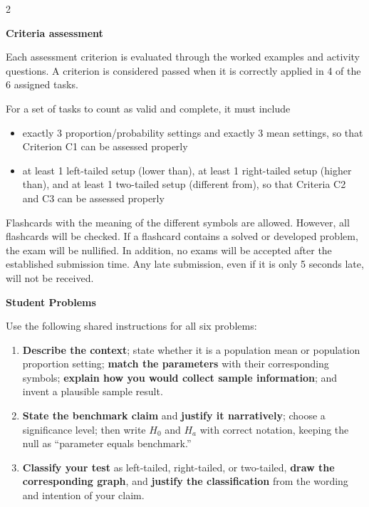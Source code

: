 \documentclass[12pt]{article}
\newcommand{\SubsectionBox}[1]{%
\noindent\colorbox{gray!30}{%
\parbox{\linewidth}{\textbf{#1}}%
}\par\vspace{0.35cm}%
}
\begin{document}
\begin{multicols}{2}
\SubsectionBox{Criteria assessment}\vspace{-0.25cm}
Each assessment criterion is evaluated through the worked examples and activity questions. A criterion is considered passed when it is correctly applied in 4 of the 6 assigned tasks.

For a set of tasks to count as valid and complete, it must include
\begin{itemize}
	\item exactly 3 proportion/probability settings and exactly 3 mean settings, so that Criterion C1 can be assessed properly
	\item at least 1 left-tailed setup (lower than), at least 1 right-tailed setup (higher than), and at least 1 two-tailed setup (different from), so that Criteria C2 and C3 can be assessed properly
\end{itemize}

Flashcards with the meaning of the different symbols are allowed. However, all flashcards will be checked. If a flashcard contains a solved or developed problem, the exam will be nullified. In addition, no exams will be accepted after the established submission time. Any late submission, even if it is only 5 seconds late, will not be received.

\vspace{0.25cm}
\SubsectionBox{Student Problems}\vspace{-0.25cm}

Use the following shared instructions for all six problems:
\begin{enumerate}
\item[(C1)] \textbf{Describe the context}; state whether it is a population mean or population proportion setting; \textbf{match the parameters} with their corresponding symbols; \textbf{explain how you would collect sample information}; and invent a plausible sample result.
\item[(C2)] \textbf{State the benchmark claim} and \textbf{justify it narratively}; choose a significance level; then write \(H_0\) and \(H_a\) with correct notation, keeping the null as ``parameter equals benchmark.''
\item[(C3)] \textbf{Classify your test} as left-tailed, right-tailed, or two-tailed, \textbf{draw the corresponding graph}, and \textbf{justify the classification} from the wording and intention of your claim.
\end{enumerate}


\end{multicols}
\end{document}
